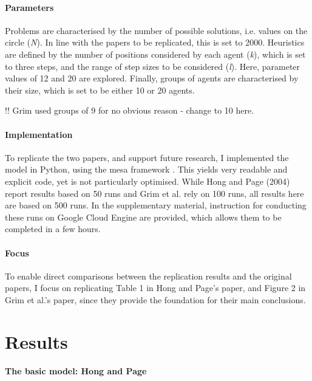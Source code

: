 \subsubsection{Parameters}

Problems are characterised by the number of possible solutions, i.e. values on the circle (\emph{N}). In line with the papers to be replicated, this is set to 2000. Heuristics are defined by the number of positions considered by each agent (\emph{k}), which is set to three steps, and the range of step sizes to be considered (\emph{l}). Here, parameter values of 12 and 20 are explored. Finally, groups of agents are characterised by their size, which is set to be either 10 or 20 agents.

!! Grim used groups of 9 for no obvious reason - change to 10 here.

\subsubsection{Implementation}

To replicate the two papers, and support future research, I implemented the model in Python, using the mesa framework \supercite{kazil2020utilizing}. This yields very readable and explicit code, yet is not particularly optimised. While Hong and Page (2004) report results based on 50 runs and Grim et al. rely on 100 runs, all results here are based on 500 runs. In the supplementary material, instruction for conducting these runs on Google Cloud Engine are provided, which allows them to be completed in a few hours.

\subsubsection{Focus}

To enable direct comparisons between the replication results and the original papers, I focus on replicating Table 1 in Hong and Page's paper, and Figure 2 in Grim et al.'s paper, since they provide the foundation for their main conclusions.

\chapter{Results}

\subsubsection{The basic model: Hong and Page}

